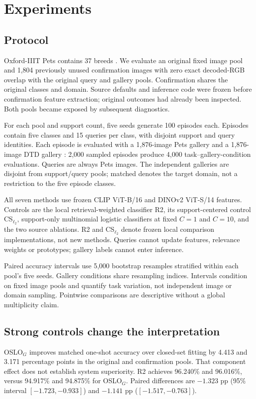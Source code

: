 \section{Experiments}
\subsection{Protocol}
Oxford-IIIT Pets contains 37 breeds \citep{pets}. We evaluate an original fixed image pool and 1,804 previously unused confirmation images with zero exact decoded-RGB overlap with the original query and gallery pools. Confirmation shares the original classes and domain. Source defaults and inference code were frozen before confirmation feature extraction; original outcomes had already been inspected. Both pools became exposed by subsequent diagnostics.

For each pool and support count, five seeds generate 100 episodes each. Episodes contain five classes and 15 queries per class, with disjoint support and query identities. Each episode is evaluated with a 1,876-image Pets gallery and a 1,876-image DTD gallery \citep{dtd}: 2,000 sampled episodes produce 4,000 task--gallery-condition evaluations. Queries are always Pets images. The independent galleries are disjoint from support/query pools; matched denotes the target domain, not a restriction to the five episode classes.

All seven methods use frozen CLIP ViT-B/16 and DINOv2 ViT-S/14 features. Controls are the local retrieval-weighted classifier R2, its support-centered control CS$_{\ell_2}$, support-only multinomial logistic classifiers at fixed $C=1$ and $C=10$, and the two source ablations. R2 and CS$_{\ell_2}$ denote frozen local comparison implementations, not new methods. Queries cannot update features, relevance weights or prototypes; gallery labels cannot enter inference.

Paired accuracy intervals use 5,000 bootstrap resamples stratified within each pool's five seeds. Gallery conditions share resampling indices. Intervals condition on fixed image pools and quantify task variation, not independent image or domain sampling. Pointwise comparisons are descriptive without a global multiplicity claim.

\subsection{Strong controls change the interpretation}

OSLO$_G$ improves matched one-shot accuracy over closed-set fitting by 4.413 and 3.171 percentage points in the original and confirmation pools. That component effect does not establish system superiority. R2 achieves 96.240\% and 96.016\%, versus 94.917\% and 94.875\% for OSLO$_G$. Paired differences are $-1.323$ pp (95\% interval $[-1.723,-0.933]$) and $-1.141$ pp ($[-1.517,-0.763]$).

